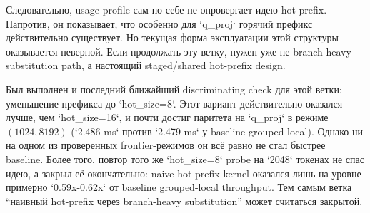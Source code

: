 Следовательно, usage-profile сам по себе не опровергает идею hot-prefix.
Напротив, он показывает, что особенно для `q_proj` горячий префикс действительно
существует. Но текущая форма эксплуатации этой структуры оказывается неверной.
Если продолжать эту ветку, нужен уже не branch-heavy substitution path, а
настоящий staged/shared hot-prefix design.

Был выполнен и последний ближайший discriminating check для этой ветки:
уменьшение префикса до `hot\_size=8`. Этот вариант действительно оказался лучше,
чем `hot\_size=16`, и почти достиг паритета на `q\_proj` в режиме
$(1024, 8192)$ (`2.486 ms` против `2.479 ms` у baseline grouped-local). Однако
ни на одном из проверенных frontier-режимов он всё равно не стал быстрее
baseline. Более того, повтор того же `hot\_size=8` probe на `2048` токенах не
спас идею, а закрыл её окончательно: naive hot-prefix kernel оказался лишь на
уровне примерно `0.59x-0.62x` от baseline grouped-local throughput. Тем самым
ветка ``наивный hot-prefix через branch-heavy substitution'' может считаться
закрытой.